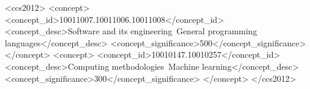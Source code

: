 \documentclass[acmsmall,review]{acmart}
\begin{document}
\begin{CCSXML}
<ccs2012>
  <concept>
    <concept_id>10011007.10011006.10011008</concept_id>
    <concept_desc>Software and its engineering~General programming languages</concept_desc>
    <concept_significance>500</concept_significance>
  </concept>
  <concept>
    <concept_id>10010147.10010257</concept_id>
    <concept_desc>Computing methodologies~Machine learning</concept_desc>
    <concept_significance>300</concept_significance>
  </concept>
</ccs2012>
\end{CCSXML}



\maketitle













\appendix

\end{document}
